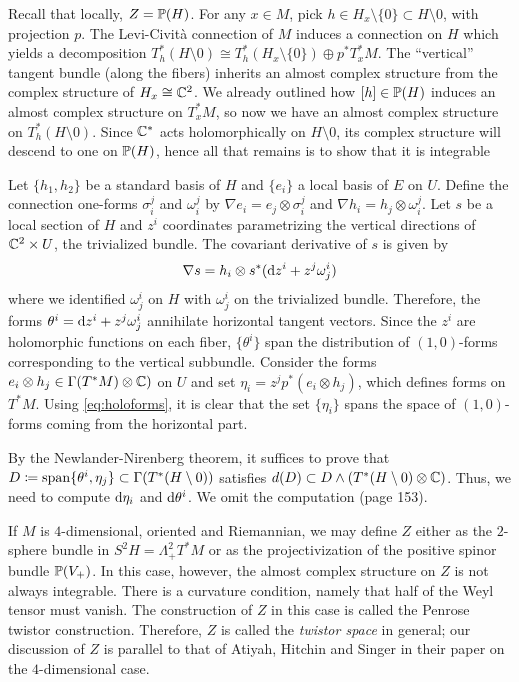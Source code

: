 \documentclass{scrartcl}
\begin{document}
\begin{myproof}
	Recall that locally, $Z=\P(H)$. For any $x\in M$, pick $h\in H_x\setminus \{0\}\subset H\setminus 0$, with projection $p$. The Levi-Civit\`a connection of $M$ induces a connection on $H$ which yields a decomposition $T^*_h(H\setminus 0)\cong T^*_h (H_x\setminus \{0\})\oplus p^* T^*_x M$. The ``vertical'' tangent bundle (along the fibers) inherits an almost complex structure from the complex structure of $H_x\cong \C^2$. We already outlined how $[h]\in \P(H)$ induces an almost complex structure on $T^*_xM$, so now we have an almost complex structure on $T^*_h(H\setminus 0)$. Since $\C^*$ acts holomorphically on $H\setminus 0$, its complex structure will descend to one on $\P(H)$, hence all that remains is to show that it is integrable
	
	\medskip
	
	Let $\{h_1,h_2\}$ be a standard basis of $H$ and $\{e_i\}$ a local basis of $E$ on $U$. Define the connection one-forms $\sigma^j_i$ and  $\omega^j_i$ by $\nabla e_i=e_j\otimes \sigma^j_i$ and $\nabla h_i=h_j\otimes \omega^j_i$. Let $s$ be a local section of $H$ and $z^i$ coordinates parametrizing the vertical directions of $\C^2\times U$, the trivialized bundle. The covariant derivative of $s$ is given by
	\begin{equation*}
		\nabla s=h_i \otimes s^*(\d z^i+z^j \omega^i_j)
	\end{equation*}
	where we identified $\omega^i_j$ on $H$ with $\omega^i_j$ on the trivialized bundle. Therefore, the forms $\theta^i=\d z^i+z^j\omega^i_j$ annihilate horizontal tangent vectors. Since the $z^i$ are holomorphic functions on each fiber, $\{\theta^i\}$ span the distribution of $(1,0)$-forms corresponding to the vertical subbundle. Consider the forms $e_i\otimes h_j\in \Gamma(T^*M)\otimes \C)$ on $U$ and set $\eta_i=z^j p^*(e_i\otimes h_j)$, which defines forms on $T^*M$. Using \cref{eq:holoforms}, it is clear that the set $\{\eta_i\}$ spans the space of $(1,0)$-forms coming from the horizontal part.
	
	\medskip
	
	By the Newlander-Nirenberg theorem, it suffices to prove that $D\coloneqq \Span\{\theta^i,\eta_j\}\subset \Gamma(T^*(H\setminus 0))$ satisfies $d(D)\subset D\wedge (T^*(H\setminus 0)\otimes \C)$. Thus, we need to compute $\d \eta_i$ and $\d \theta^i$. We omit the computation (page 153). 
\end{myproof}

\begin{rem}
	If $M$ is $4$-dimensional, oriented and Riemannian, we may define $Z$ either as the $2$-sphere bundle in $S^2H=\Lambda^2_+T^*M$ or as the projectivization of the positive spinor bundle $\P(V_+)$. In this case, however, the almost complex structure on $Z$ is not always integrable. There is a curvature condition, namely that half of the Weyl tensor must vanish. The construction of $Z$ in this case is called the Penrose twistor construction. Therefore, $Z$ is called the \emph{twistor space} in general; our discussion of $Z$ is parallel to that of Atiyah, Hitchin and Singer in their paper on the $4$-dimensional case.
\end{rem}
\end{document}

